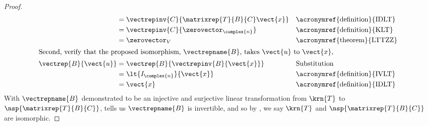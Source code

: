 \begin{proof}
\begin{align*}
&=\vectrepinv{C}{\matrixrep{T}{B}{C}\vect{x}}&&\text{\acronymref{definition}{IDLT}}\\
&=\vectrepinv{C}{\zerovector_{\complex{n}}}&&\text{\acronymref{definition}{KLT}}\\
&=\zerovector_{V}&&\text{\acronymref{theorem}{LTTZZ}}\\
%
\intertext{Second, verify that the proposed isomorphism, $\vectrepname{B}$, takes $\vect{u}$ to $\vect{x}$,}
%
\vectrep{B}{\vect{u}}&=\vectrep{B}{\vectrepinv{B}{\vect{x}}}&&\text{Substitution}\\
&=\lt{I_{\complex{n}}}{\vect{x}}&&\text{\acronymref{definition}{IVLT}}\\
&=\vect{x}&&\text{\acronymref{definition}{IDLT}}
%
\end{align*}
%
With $\vectrepname{B}$ demonstrated to be an injective and surjective linear transformation from $\krn{T}$ to $\nsp{\matrixrep{T}{B}{C}}$,  tells us $\vectrepname{B}$ is invertible, and so by , we say $\krn{T}$ and $\nsp{\matrixrep{T}{B}{C}}$ are isomorphic.
%
\end{proof}
%
%
